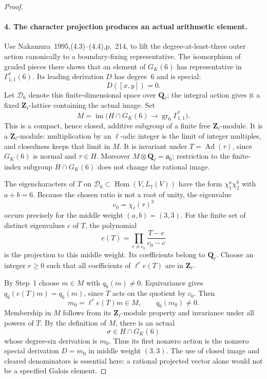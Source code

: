 \begin{proof}
\paragraph{4. The character projection produces an actual arithmetic element.}
Use Nakamura~1995,(4.3)--(4.4),p.~214, to lift\cite{AuditNakamura1995} the degree-at-least-three
outer action canonically to a boundary-fixing representative.
The isomorphism of graded pieces there shows that an element of
$G_K(6)$ has representative in $\Gamma^*_{1,1}(6)$.
Its leading derivation $D$ has degree~6 and is special:
\[
 D([x,y])=0.
\]
Let $\mathcal D_6$ denote this finite-dimensional space over
$\mathbf Q_\ell$; the integral action gives it a fixed
$\mathbf Z_\ell$-lattice containing the actual image. Set
\[
 M=\operatorname{im}\bigl(H\cap G_K(6)\longrightarrow
       \operatorname{gr}_6\Gamma^*_{1,1}\bigr).
\]
This is a compact, hence closed, additive subgroup of a finite free
$\mathbf Z_\ell$-module. It is a $\mathbf Z_\ell$-module: multiplication
by an $\ell$-adic integer is the limit of integer multiples, and
closedness keeps that limit in $M$. It is invariant under
$T=\operatorname{Ad}(\tau)$, since $G_K(6)$ is normal and
$\tau\in H$. Moreover $M\otimes\mathbf Q_\ell=\mathfrak a_6$;
restriction to the finite-index subgroup $H\cap G_K(6)$ does not
change the rational image.

The eigencharacters of $T$ on $\mathcal D_6\subset
\operatorname{Hom}(V,L_7(V))$ have the form
$\chi_1^a\chi_2^b$ with $a+b=6$. Because the chosen ratio is not
a root of unity, the eigenvalue
\[
 c_0=\chi_\ell(\tau)^3
\]
occurs precisely for the middle weight $(a,b)=(3,3)$.
For the finite set of distinct eigenvalues $c$ of $T$, the polynomial
\[
 e(T)=\prod_{c\ne c_0}\frac{T-c}{c_0-c}
\]
is the projection to this middle weight. Its coefficients belong
to $\mathbf Q_\ell$. Choose an integer $r\ge0$ such that all
coefficients of $\ell^r e(T)$ are in $\mathbf Z_\ell$.

By Step~1 choose $m\in M$ with $q_6(m)\ne0$. Equivariance gives
$q_6(e(T)m)=q_6(m)$, since $T$ acts on the quotient by $c_0$.
Then
\[
 m_0=\ell^r e(T)m\in M,\qquad q_6(m_0)\ne0.
\]
Membership in $M$ follows from its $\mathbf Z_\ell$-module property
and invariance under all powers of $T$. By the definition of $M$,
there is an actual
\[
 \sigma\in H\cap G_K(6)
\]
whose degree-six derivation is $m_0$. Thus its first nonzero action
is the nonzero special derivation $D=m_0$ in middle weight $(3,3)$.
The use of closed image and cleared denominators is essential here:
a rational projected vector alone would not be a specified Galois
element.


\end{proof}
